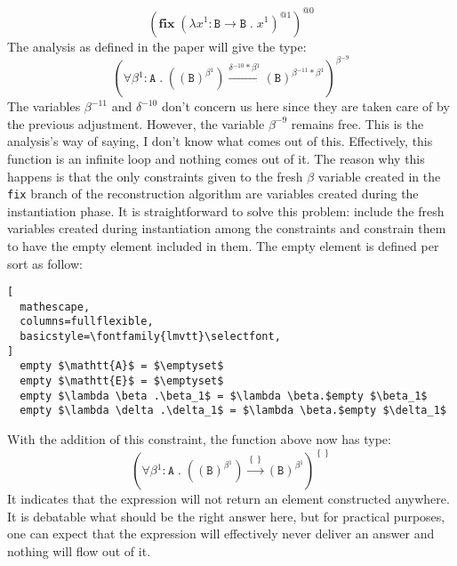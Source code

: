 \documentclass[8pt]{extarticle}
\begin{document}
\[
\left(\mathbf{fix}\;{}\left(\lambda{}x^{1}:\mathtt{B}\to{}\mathtt{B}\;{}.\;{}x^{1}\right)^{\mathit{@1}}\right)^{\mathit{@0}}
\]
The analysis as defined in the paper will give the type:
\[
\left(\forall{}\beta{}^{1}:\mathtt{A}\;{}.\;{}\left(\left(\mathtt{B}\right)^{\beta{}^{1}}\right)\xrightarrow{\delta{}^{-10}*\beta{}^{1}}\left(\mathtt{B}\right)^{\beta{}^{-11}*\beta{}^{1}}\right)^{\beta{}^{-9}}
\]
The variables $\beta^{-11}$ and $\delta^{-10}$ don't concern us here since they are taken care of by the previous adjustment. However, the variable $\beta^{-9}$ remains free. This is the analysis's way of saying, I don't know what comes out of this. Effectively, this function is an infinite loop and nothing comes out of it. The reason why this happens is that the only constraints given to the fresh $\beta$ variable created in the \verb+fix+ branch of the reconstruction algorithm are variables created during the instantiation phase. It is straightforward to solve this problem: include the fresh variables created during instantiation among the constraints and constrain them to have the empty element included in them. The empty element is defined per sort as follow:
\begin{lstlisting}[
  mathescape,
  columns=fullflexible,
  basicstyle=\fontfamily{lmvtt}\selectfont,
]
  empty $\mathtt{A}$ = $\emptyset$
  empty $\mathtt{E}$ = $\emptyset$
  empty $\lambda \beta .\beta_1$ = $\lambda \beta.$empty $\beta_1$
  empty $\lambda \delta .\delta_1$ = $\lambda \beta.$empty $\delta_1$
\end{lstlisting}
With the addition of this constraint, the function above now has type:
\[
\left(\forall{}\beta{}^{1}:\mathtt{A}\;{}.\;{}\left(\left(\mathtt{B}\right)^{\beta{}^{1}}\right)\xrightarrow{\left\{\right\}}\left(\mathtt{B}\right)^{\beta{}^{1}}\right)^{\left\{\right\}}
\]
It indicates that the expression will not return an element constructed anywhere. It is debatable what should be the right answer here, but for practical purposes, one can expect that the expression will effectively never deliver an answer and nothing will flow out of it.
\end{document}
